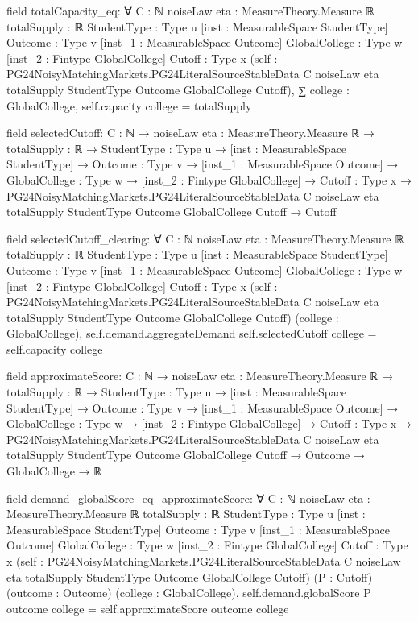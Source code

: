 \documentclass[10pt]{article}
\begin{document}
\begin{ReviewVerbatim}
field totalCapacity_eq:
∀ {C : ℕ} {noiseLaw eta : MeasureTheory.Measure ℝ} {totalSupply : ℝ} {StudentType : Type u}
  [inst : MeasurableSpace StudentType] {Outcome : Type v} [inst_1 : MeasurableSpace Outcome] {GlobalCollege : Type w}
  [inst_2 : Fintype GlobalCollege] {Cutoff : Type x}
  (self :
    PG24NoisyMatchingMarkets.PG24LiteralSourceStableData C noiseLaw eta totalSupply StudentType Outcome GlobalCollege
      Cutoff),
  ∑ college : GlobalCollege, self.capacity college = totalSupply

field selectedCutoff:
{C : ℕ} →
  {noiseLaw eta : MeasureTheory.Measure ℝ} →
    {totalSupply : ℝ} →
      {StudentType : Type u} →
        [inst : MeasurableSpace StudentType] →
          {Outcome : Type v} →
            [inst_1 : MeasurableSpace Outcome] →
              {GlobalCollege : Type w} →
                [inst_2 : Fintype GlobalCollege] →
                  {Cutoff : Type x} →
                    PG24NoisyMatchingMarkets.PG24LiteralSourceStableData C noiseLaw eta totalSupply StudentType Outcome
                        GlobalCollege Cutoff →
                      Cutoff

field selectedCutoff_clearing:
∀ {C : ℕ} {noiseLaw eta : MeasureTheory.Measure ℝ} {totalSupply : ℝ} {StudentType : Type u}
  [inst : MeasurableSpace StudentType] {Outcome : Type v} [inst_1 : MeasurableSpace Outcome] {GlobalCollege : Type w}
  [inst_2 : Fintype GlobalCollege] {Cutoff : Type x}
  (self :
    PG24NoisyMatchingMarkets.PG24LiteralSourceStableData C noiseLaw eta totalSupply StudentType Outcome GlobalCollege
      Cutoff)
  (college : GlobalCollege), self.demand.aggregateDemand self.selectedCutoff college = self.capacity college

field approximateScore:
{C : ℕ} →
  {noiseLaw eta : MeasureTheory.Measure ℝ} →
    {totalSupply : ℝ} →
      {StudentType : Type u} →
        [inst : MeasurableSpace StudentType] →
          {Outcome : Type v} →
            [inst_1 : MeasurableSpace Outcome] →
              {GlobalCollege : Type w} →
                [inst_2 : Fintype GlobalCollege] →
                  {Cutoff : Type x} →
                    PG24NoisyMatchingMarkets.PG24LiteralSourceStableData C noiseLaw eta totalSupply StudentType Outcome
                        GlobalCollege Cutoff →
                      Outcome → GlobalCollege → ℝ

field demand_globalScore_eq_approximateScore:
∀ {C : ℕ} {noiseLaw eta : MeasureTheory.Measure ℝ} {totalSupply : ℝ} {StudentType : Type u}
  [inst : MeasurableSpace StudentType] {Outcome : Type v} [inst_1 : MeasurableSpace Outcome] {GlobalCollege : Type w}
  [inst_2 : Fintype GlobalCollege] {Cutoff : Type x}
  (self :
    PG24NoisyMatchingMarkets.PG24LiteralSourceStableData C noiseLaw eta totalSupply StudentType Outcome GlobalCollege
      Cutoff)
  (P : Cutoff) (outcome : Outcome) (college : GlobalCollege),
  self.demand.globalScore P outcome college = self.approximateScore outcome college


\end{ReviewVerbatim}
\end{document}
